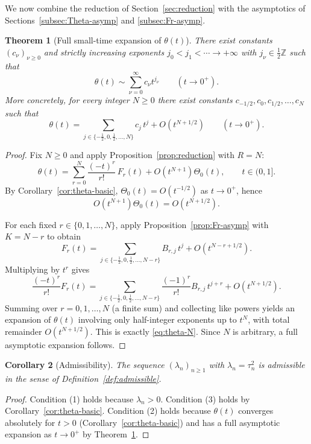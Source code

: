 \documentclass[11pt,letterpaper]{amsart}
\numberwithin{equation}{section}
\newtheorem{theorem}{Theorem}[section]
\newtheorem{corollary}[theorem]{Corollary}
\theoremstyle{definition}
\newcommand{\Z}{\mathbb{Z}}
\begin{document}
We now combine the reduction of Section~\ref{sec:reduction} with the asymptotics of Sections~\ref{subsec:Theta-asymp} and \ref{subsec:Fr-asymp}.

\begin{theorem}[Full small-time expansion of $\theta(t)$]\label{thm:theta-asymp}
There exist constants $(c_\nu)_{\nu\ge 0}$ and strictly increasing exponents
$j_0<j_1<\cdots\to+\infty$ with $j_\nu\in \tfrac12\Z$ such that
\[
\theta(t)\sim \sum_{\nu=0}^\infty c_\nu t^{j_\nu}\qquad (t\to 0^+).
\]
More concretely, for every integer $N\ge 0$ there exist constants
$c_{-1/2},c_0,c_{1/2},\dots,c_N$ such that
\begin{equation}\label{eq:theta-N}
\theta(t)=\sum_{j\in\{-\tfrac12,0,\tfrac12,\dots,N\}} c_j\,t^{j} + O(t^{N+1/2})
\qquad (t\to 0^+).
\end{equation}
\end{theorem}

\begin{proof}
Fix $N\ge 0$ and apply Proposition~\ref{prop:reduction} with $R=N$:
\[
\theta(t)=\sum_{r=0}^{N}\frac{(-t)^r}{r!}\,F_r(t)+O(t^{N+1})\Theta_0(t),
\qquad t\in(0,1].
\]
By Corollary~\ref{cor:theta-basic}, $\Theta_0(t)=O(t^{-1/2})$ as $t\to 0^+$, hence
\[
O(t^{N+1})\Theta_0(t)=O(t^{N+1/2}).
\]

For each fixed $r\in\{0,1,\dots,N\}$, apply Proposition~\ref{prop:Fr-asymp} with
$K=N-r$ to obtain
\[
F_r(t)=\sum_{j\in\{-\tfrac12,0,\tfrac12,\dots,N-r\}}B_{r,j}\,t^{j}
+O(t^{N-r+1/2}).
\]
Multiplying by $t^r$ gives
\[
\frac{(-t)^r}{r!}F_r(t)
=\sum_{j\in\{-\tfrac12,0,\tfrac12,\dots,N-r\}}\frac{(-1)^r}{r!}B_{r,j}\,t^{j+r}
+O(t^{N+1/2}).
\]
Summing over $r=0,1,\dots,N$ (a finite sum) and collecting like powers yields an
expansion of $\theta(t)$ involving only half-integer exponents up to $t^N$, with total
remainder $O(t^{N+1/2})$. This is exactly \eqref{eq:theta-N}. Since $N$ is arbitrary,
a full asymptotic expansion follows.
\end{proof}

\begin{corollary}[Admissibility]\label{cor:admissible}
The sequence $(\lambda_n)_{n\ge 1}$ with $\lambda_n=\tau_n^2$ is admissible
in the sense of Definition~\ref{def:admissible}.
\end{corollary}

\begin{proof}
Condition (1) holds because $\lambda_n>0$.
Condition (3) holds by Corollary~\ref{cor:theta-basic}.
Condition (2) holds because $\theta(t)$ converges absolutely for $t>0$ (Corollary~\ref{cor:theta-basic})
and has a full asymptotic expansion as $t\to 0^+$ by Theorem~\ref{thm:theta-asymp}.
\end{proof}
\end{document}
